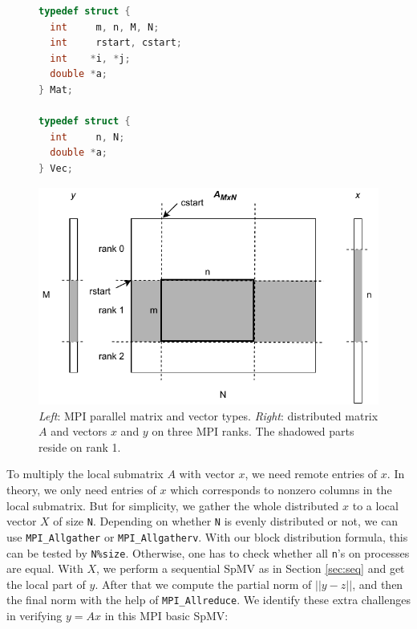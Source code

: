 \documentclass[submission]{eptcs}
\begin{document}
\vspace{-10pt}
\begin{figure}[h]
\begin{minipage}{0.35\textwidth}
\begin{lstlisting}[language=C]
typedef struct {
  int     m, n, M, N;
  int     rstart, cstart;
  int    *i, *j;
  double *a;
} Mat;

typedef struct {
  int     n, N;
  double *a;
} Vec;
\end{lstlisting}
\end{minipage}
\hfill
\begin{minipage}{0.60\textwidth}
    \includegraphics[width=1.0\textwidth]{figs/MPICSR.pdf}
\end{minipage}
\vspace{-10pt}
\caption{{\it Left}: MPI parallel matrix and vector types.
{\it Right}: distributed matrix $A$ and vectors $x$ and $y$ on three MPI ranks.
The shadowed parts reside on rank 1.}
\label{fig:mpicsr}
\vspace{-5pt}
\end{figure}


To multiply the local submatrix $A$ with vector $x$, we need remote entries of $x$. In theory, we only
need entries of $x$ which corresponds to nonzero columns in the local submatrix. But for simplicity,
we gather the whole distributed $x$ to a local vector $X$ of size {\tt N}.
Depending on whether {\tt N} is evenly distributed or not, we can use {\tt MPI_Allgather} or {\tt MPI_Allgatherv}.
With our block distribution formula, this can be tested by {\tt N\%size}. Otherwise,
one has to check whether all {\tt n}'s on processes are equal.
With $X$, we perform a sequential SpMV as in Section \ref{sec:seq} and get the local part of
$y$. After that we compute the partial norm of $||y - z||$, and
then the final norm with the help of {\tt MPI_Allreduce}.
We identify these extra challenges in verifying $y=Ax$ in this MPI basic SpMV:
\end{document}
